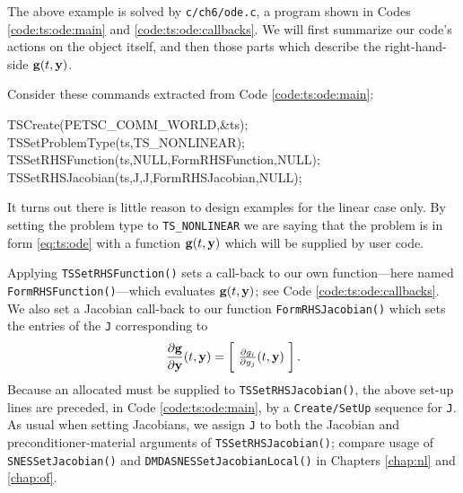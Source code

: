 The above example is solved by \texttt{c/ch6/ode.c}, a program shown in Codes \ref{code:ts:ode:main} and \ref{code:ts:ode:callbacks}.  We will first summarize our code's actions on the \pTS object itself, and then those parts which describe the right-hand-side $\mathbf{g}(t,\mathbf{y})$.


Consider these commands extracted from Code \ref{code:ts:ode:main}:
\begin{code}
  TSCreate(PETSC_COMM_WORLD,&ts);
  TSSetProblemType(ts,TS_NONLINEAR);
  TSSetRHSFunction(ts,NULL,FormRHSFunction,NULL);
  TSSetRHSJacobian(ts,J,J,FormRHSJacobian,NULL);
\end{code}
It turns out there is little reason to design \PETSc examples for the linear case only.  By setting the problem type to \texttt{TS\_NONLINEAR} we are saying that the problem is in form \eqref{eq:ts:ode} with a function $\mathbf{g}(t,\mathbf{y})$ which will be supplied by user code.

Applying \texttt{TSSetRHSFunction()} sets a call-back to our own function---here named \texttt{FormRHSFunction()}---which evaluates $\mathbf{g}(t,\mathbf{y})$; see Code \ref{code:ts:ode:callbacks}.  We also set a Jacobian call-back to our function \texttt{FormRHSJacobian()} which sets the entries of the \pMat \texttt{J} corresponding to
    $$\frac{\partial \mathbf{g}}{\partial \mathbf{y}}(t,\mathbf{y}) = \begin{bmatrix}\phantom{\bigg|} \frac{\partial g_i}{\partial y_j}(t,\mathbf{y}) \phantom{\bigg|}\end{bmatrix}.$$
Because an allocated \pMat must be supplied to \texttt{TSSetRHSJacobian()}, the above \pTS set-up lines are preceded, in Code \ref{code:ts:ode:main}, by a \texttt{Create/SetUp} sequence for \pMat \texttt{J}.  As usual when setting Jacobians, we assign \texttt{J} to both the Jacobian and preconditioner-material arguments of \texttt{TSSetRHSJacobian()}; compare usage of \texttt{SNESSetJacobian()} and \texttt{DMDASNESSetJacobianLocal()} in Chapters \ref{chap:nl} and \ref{chap:of}.

